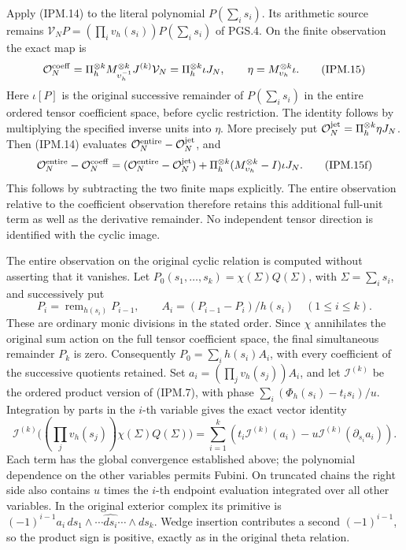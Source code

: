 \documentclass[11pt,a4paper]{article}
\theoremstyle{definition}
\begin{document}
Apply (IPM.14) to the literal polynomial \(P(\sum_i s_i)\).
Its arithmetic source remains
\(\mathcal V_NP=(\prod_i v_h(s_i))P(\sum_i s_i)\) of PGS.4.
On the finite observation the exact map is
\[
 \mathcal O^{\rm coeff}_N
    =\Pi_h^{\otimes k}M_{\upsilon_h^{-1}}^{\otimes k}
                     J^{(k)}\mathcal V_N
    =\Pi_h^{\otimes k}\iota J_N,
 \qquad \eta=M_{\upsilon_h}^{\otimes k}\iota.
 \tag{IPM.15}
\]
Here \(\iota[P]\) is the original successive remainder of
\(P(\sum_i s_i)\) in the entire ordered tensor coefficient space,
before cyclic restriction. The identity follows by multiplying the
specified inverse units into \(\eta\). More precisely put
\(\mathcal O_N^{\rm jet}=\Pi_h^{\otimes k}\eta J_N\).
Then (IPM.14) evaluates
\(\mathcal O_N^{\rm entire}-\mathcal O_N^{\rm jet}\), and
\[
 \mathcal O_N^{\rm entire}-\mathcal O_N^{\rm coeff}
 =(\mathcal O_N^{\rm entire}-\mathcal O_N^{\rm jet})
   +\Pi_h^{\otimes k}
       (M_{\upsilon_h}^{\otimes k}-I)\iota J_N .
 \tag{IPM.15f}
\]
This follows by subtracting the two finite maps explicitly.
The entire observation relative to the coefficient observation
therefore retains this additional full-unit term as well as the
derivative remainder. No independent tensor direction is identified
with the cyclic image.

The entire observation on the original cyclic relation is computed
without asserting that it vanishes. Let
\(P_0(s_1,\ldots,s_k)=\chi(\Sigma)Q(\Sigma)\), with
\(\Sigma=\sum_i s_i\), and successively put
\[
 P_i=\operatorname{rem}_{h(s_i)}P_{i-1},\qquad
 A_i=(P_{i-1}-P_i)/h(s_i)\quad(1\le i\le k).
 \tag{IPM.15a}
\]
These are ordinary monic divisions in the stated order. Since \(\chi\)
annihilates the original sum action on the full tensor coefficient
space, the final simultaneous remainder \(P_k\) is zero. Consequently
\(P_0=\sum_i h(s_i)A_i\), with every coefficient of the successive
quotients retained. Set \(a_i=(\prod_jv_h(s_j))A_i\), and let
\(\mathcal I^{(k)}\) be the ordered product version of (IPM.7), with
phase \(\sum_i(\Phi_h(s_i)-t_i s_i)/u\). Integration by parts in
the \(i\)-th variable gives the exact vector identity
\[
 \mathcal I^{(k)}\bigl((\prod_jv_h(s_j))\chi(\Sigma)Q(\Sigma)\bigr)
 =\sum_{i=1}^k
       \left(t_i\mathcal I^{(k)}(a_i)
                 -u\mathcal I^{(k)}(\partial_{s_i}a_i)\right).
 \tag{IPM.15b}
\]
Each term has the global convergence established above; the polynomial
dependence on the other variables permits Fubini. On truncated chains
the right side also contains \(u\) times the \(i\)-th endpoint
evaluation integrated over all other variables. In the original
exterior complex its primitive is
\((-1)^{i-1}a_i\,ds_1\wedge\cdots\widehat{ds_i}\cdots\wedge ds_k\).
Wedge insertion contributes a second \((-1)^{i-1}\), so the product
sign is positive, exactly as in the original theta relation.
\end{document}

